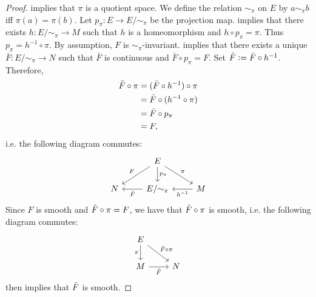 \documentclass{book}
\begin{document}
	\begin{proof}
		 implies that $\pi$ is a quotient space. We define the relation $\sim_{\pi}$ on $E$ by $a \sim_{\pi} b$ iff $\pi(a) = \pi(b)$. Let $p_{\pi}:E \rightarrow E/{\sim_{\pi}}$ be the projection map.  implies that there exists $h: E/{\sim_{\pi}} \rightarrow M$ such that $h$ is a homeomorphism and $h \circ p_{\pi} = \pi$. Thus $p_{\pi} = h^{-1} \circ \pi$. By assumption, $F$ is $\sim_{\pi}$-invariant.  implies that there exists a unique $\bar{F}: E/{\sim_{\pi}} \rightarrow N$ such that $\bar{F}$ is continuous and $\bar{F} \circ p_{\pi} = F$. Set $\tilde{F} \vcentcolon= \bar{F} \circ h^{-1}$. Therefore,
		\begin{align*}
			\tilde{F} \circ \pi
			& = (\bar{F} \circ h^{-1}) \circ \pi \\
			& = \bar{F} \circ (h^{-1} \circ \pi) \\
			& = \bar{F} \circ p_{\pi} \\
			& = F,
		\end{align*}
		i.e. the following diagram commutes: 
		\[ 
		\begin{tikzcd}
			& E \arrow[dl, "F"'] \arrow[d, "p_{\pi}"] \arrow[dr, "\pi"] &   \\
			N & E/{\sim_{\pi}} \arrow[l, "\bar{F}"] &  M \arrow[l, "h^{-1}"]
		\end{tikzcd}
		\]
		Since $F$ is smooth and $\tilde{F} \circ \pi = F$, we have that $\tilde{F} \circ \pi$ is smooth, i.e. the following diagram commutes: 
		\[ 
		\begin{tikzcd}
			E \arrow[d, "\pi"'] \arrow[dr, "\tl{F} \circ \pi"] &   \\
			M \arrow[r, "\tl{F}"'] &  N
		\end{tikzcd}
		\]
		 then implies that $\tilde{F}$ is smooth.
	\end{proof}
	
\end{document}
